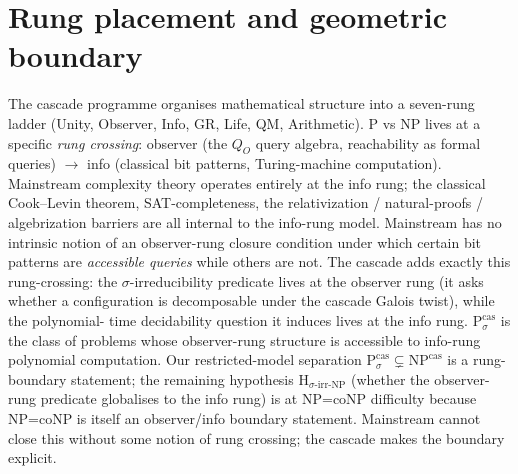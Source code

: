\documentclass[11pt, a4paper]{amsart}
\theoremstyle{definition}
\begin{document}
\begin{abstract}
Under \emph{all three} (H$_{\text{σ-irr-NP}}$,
$\mathbf{B_{\sigma\text{-}P}}$, and structural completeness), the
cascade argument would yield $\mathrm{P} \neq \mathrm{NP}$
classically via Church-Turing equivalence; we do not establish any
of the three. In the verdict classification, this is a
(\textgamma)-class bridge: the restricted-model separation
(even if discharged) does not directly imply classical
P vs NP without the additional, unestablished structural-
completeness conjecture. The cascade framework provides a new
\emph{language} for stating the problem — a Galois-theoretic
σ-irreducibility predicate that avoids relativization, natural
proofs, and algebrization barriers in its restricted class — but
does not supply a proof of classical $\mathrm{P} \neq \mathrm{NP}$
within its current infrastructure.
\end{abstract}

\tableofcontents

\section*{Rung placement and geometric boundary}

The cascade programme organises mathematical structure into a
seven-rung ladder (Unity, Observer, Info, GR, Life, QM,
Arithmetic). P vs NP lives at a specific \emph{rung crossing}:
observer (the $Q_O$ query algebra, reachability as formal queries)
$\to$ info (classical bit patterns, Turing-machine computation).
Mainstream complexity theory operates entirely at the info rung;
the classical Cook--Levin theorem, SAT-completeness, the relativization
/ natural-proofs / algebrization barriers are all internal to the
info-rung model. Mainstream has no intrinsic notion of an
observer-rung closure condition under which certain bit patterns are
\emph{accessible queries} while others are not. The cascade adds
exactly this rung-crossing: the $\sigma$-irreducibility predicate
lives at the observer rung (it asks whether a configuration is
decomposable under the cascade Galois twist), while the polynomial-
time decidability question it induces lives at the info rung.
$\mathrm{P}_\sigma^{\mathrm{cas}}$ is the class of problems whose
observer-rung structure is accessible to info-rung polynomial
computation. Our restricted-model separation
$\mathrm{P}_\sigma^{\mathrm{cas}} \subsetneq \mathrm{NP}^{\mathrm{cas}}$
is a rung-boundary statement; the remaining hypothesis
H$_{\sigma\text{-irr-NP}}$ (whether the observer-rung predicate
globalises to the info rung) is at NP=coNP difficulty because
NP=coNP is itself an observer/info boundary statement. Mainstream
cannot close this without some notion of rung crossing; the cascade
makes the boundary explicit.
\end{document}
